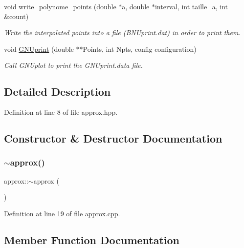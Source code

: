 \begin{DoxyCompactItemize}
void \mbox{\hyperlink{classapprox_a342792f126728ac2ffecae1599420946}{write\+\_\+polynome\+\_\+points}} (double $\ast$a, double $\ast$interval, int taille\+\_\+a, int \&count)
\begin{DoxyCompactList}\small\item\em Write the interpolated points into a file (B\+N\+Uprint.\+dat) in order to print them. \end{DoxyCompactList}\item 
void \mbox{\hyperlink{classapprox_a4c392064b5f2c9cd4ba96ade669571c1}{G\+N\+Uprint}} (double $\ast$$\ast$Points, int Npts, config configuration)
\begin{DoxyCompactList}\small\item\em Call G\+N\+Uplot to print the G\+N\+Uprint.\+data file. \end{DoxyCompactList}\end{DoxyCompactItemize}


\subsection{Detailed Description}


Definition at line 8 of file approx.\+hpp.



\subsection{Constructor \& Destructor Documentation}
\mbox{\label{classapprox_a125182047a0ed636dbbe045f0734f39b}} 
\subsubsection{\texorpdfstring{$\sim$approx()}{~approx()}}
{\footnotesize\ttfamily approx\+::$\sim$approx (\begin{DoxyParamCaption}{ }\end{DoxyParamCaption})\hspace{0.3cm}{\ttfamily [pure virtual]}}



Definition at line 19 of file approx.\+cpp.



\subsection{Member Function Documentation}
\mbox{\label{classapprox_a2ebff31fe5a8710ead73f59d3c3d51fe}} 
